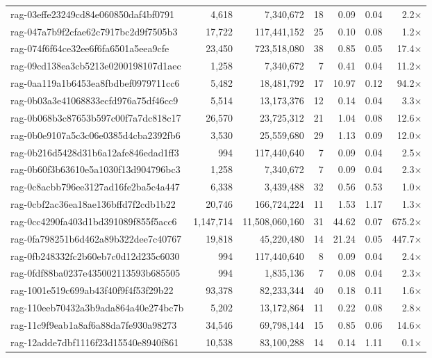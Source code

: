 \begin{table}[h!]
\begin{tabular}{lrrrrrr}
rag-03effe23249cd84e060850daf4bf0791 & 4,618 & 7,340,672 & 18 & 0.09 & 0.04 & 2.2$\times$ \\
rag-047a7b9f2cfae62c7917bc2d9f7505b3 & 17,722 & 117,441,152 & 25 & 0.10 & 0.08 & 1.2$\times$ \\
rag-074f6f64ce32ee6f6fa6501a5eea9cfe & 23,450 & 723,518,080 & 38 & 0.85 & 0.05 & 17.4$\times$ \\
rag-09cd138ea3cb5213e0200198107d1aec & 1,258 & 7,340,672 & 7 & 0.41 & 0.04 & 11.2$\times$ \\
rag-0aa119a1b6453ea8fbdbef0979711cc6 & 5,482 & 18,481,792 & 17 & 10.97 & 0.12 & 94.2$\times$ \\
rag-0b03a3e41068833ecfd976a75df46cc9 & 5,514 & 13,173,376 & 12 & 0.14 & 0.04 & 3.3$\times$ \\
rag-0b068b3c87653b597c00f7a7dc818c17 & 26,570 & 23,725,312 & 21 & 1.04 & 0.08 & 12.6$\times$ \\
rag-0b0e9107a5c3c06e0385d4cba2392fb6 & 3,530 & 25,559,680 & 29 & 1.13 & 0.09 & 12.0$\times$ \\
rag-0b216d5428d31b6a12afe846edad1ff3 & 994 & 117,440,640 & 7 & 0.09 & 0.04 & 2.5$\times$ \\
rag-0b60f3b63610e5a1030f13d904796bc3 & 1,258 & 7,340,672 & 7 & 0.09 & 0.04 & 2.3$\times$ \\
rag-0c8acbb796ee3127ad16fe2ba5c4a447 & 6,338 & 3,439,488 & 32 & 0.56 & 0.53 & 1.0$\times$ \\
rag-0cbf2ac36ea18ae136bffd7f2cdb1b22 & 20,746 & 166,724,224 & 11 & 1.53 & 1.17 & 1.3$\times$ \\
rag-0cc4290fa403d1bd391089f855f5acc6 & 1,147,714 & 11,508,060,160 & 31 & 44.62 & 0.07 & 675.2$\times$ \\
rag-0fa798251b6d462a89b322dee7c40767 & 19,818 & 45,220,480 & 14 & 21.24 & 0.05 & 447.7$\times$ \\
rag-0fb248332fc2b60eb7c0d12d235c6030 & 994 & 117,440,640 & 8 & 0.09 & 0.04 & 2.4$\times$ \\
rag-0fdf88ba0237e435002113593b685505 & 994 & 1,835,136 & 7 & 0.08 & 0.04 & 2.3$\times$ \\
rag-1001e519c699ab43f40f9f4f53f29b22 & 93,378 & 82,233,344 & 40 & 0.18 & 0.11 & 1.6$\times$ \\
rag-110eeb70432a3b9ada864a40e274bc7b & 5,202 & 13,172,864 & 11 & 0.22 & 0.08 & 2.8$\times$ \\
rag-11c9f9eab1a8af6a88da7fe930a98273 & 34,546 & 69,798,144 & 15 & 0.85 & 0.06 & 14.6$\times$ \\
rag-12adde7dbf1116f23d15540e8940f861 & 10,538 & 83,100,288 & 14 & 0.14 & 1.11 & 0.1$\times$ \\

\end{tabular}
\end{table}
